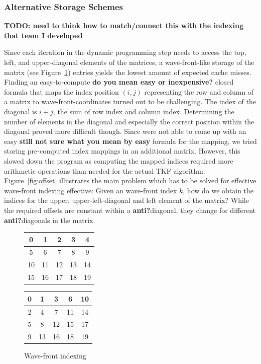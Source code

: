 \documentclass[runningheads,a4paper]{llncs}
\begin{document}
\subsubsection{Alternative Storage Schemes}
\label{par:otherattempts}
{\bf TODO: need to think how to match/connect this with the indexing that team I developed} 

Since each iteration in the dynamic programming step needs to access the top, left, and upper-diagonal elements of the matrices, 
a wave-front-like storage of the matrix (see Figure~\ref{fig:wavefront}) entries yields the lowest amount of expected cache misses. 
Finding an easy-to-compute {\bf do you mean easy or inexpensive?} closed formula that maps the index position $(i,j)$ representing the row and column of a matrix 
to wave-front-coordinates turned out to be challenging. 
The index of the diagonal is $i+j$, the sum of row index and column index. 
Determining the number of elements in the diagonal and especially the correct position within the diagonal proved more difficult though.
Since were not able to come up with an easy {\bf still not sure what you mean by easy} formula for the mapping, 
we tried storing pre-computed index mappings in an additional matrix. 
However, this slowed down the program as computing the mapped indices required more arithmetic operations than needed for the actual TKF algorithm.
Figure~\ref{fig:offset} illustrates the main problem which has to be solved 
for effective wave-front indexing effective: Given an wave-front index $k$, how do we obtain the indices for the upper, upper-left-diagonal and left element of the matrix? 
While the required offsets are constant within a {\bf anti?}diagonal, they change for different {\bf anti?}diagonals in the matrix.

\begin{figure}

\begin{minipage}{0.5\textwidth}
\centering
\begin{tabular}{|c|c|c|c|c|}
\hline 
0 & 1 & 2 & 3 & 4 \\ 
\hline 
5 & 6 & 7 & 8 & 9 \\ 
\hline 
10 & 11 & 12 & 13 & 14 \\ 
\hline 
15 & 16 & 17 & 18 & 19 \\ 
\hline
\end{tabular}
\caption{Row-major indexing}
\label{fig:rowmajor}
\end{minipage}
\begin{minipage}{0.5\textwidth}
\centering
\begin{tabular}{|c|c|c|c|c|}
\hline 
0 & 1 & 3 & 6 & 10 \\ 
\hline 
2 & 4 & 7 & 11 & 14 \\ 
\hline 
5 & 8 & 12 & 15 & 17 \\ 
\hline 
9 & 13 & 16 & 18 & 19 \\ 
\hline 
\end{tabular}
\caption{Wave-front indexing}
\label{fig:wavefront}
\end{minipage}
\end{figure}
\end{document}
